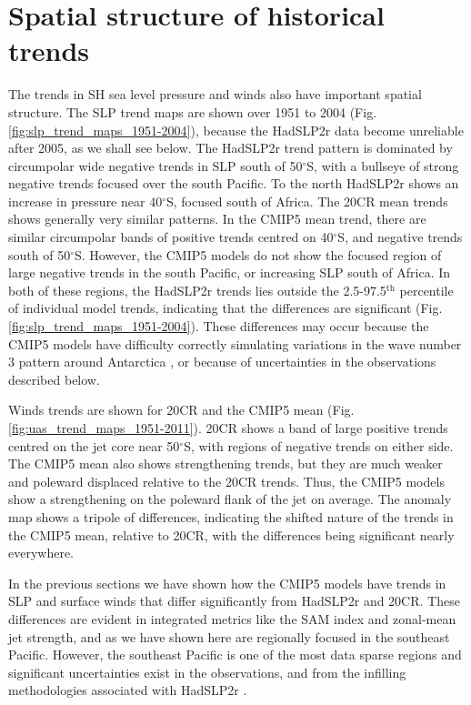 \documentclass{ametsoc}
\begin{document}
\section{Spatial structure of historical trends} \label{sec:spatial_patterns}
The trends in SH sea level pressure and winds also have important spatial structure. The SLP
trend maps are shown over 1951 to 2004 (Fig. \ref{fig:slp_trend_maps_1951-2004}), 
because the HadSLP2r data become unreliable after 2005, as we shall see below. The HadSLP2r trend
pattern is dominated by circumpolar wide negative trends in SLP south of 50$^{\circ}$S, with 
a bullseye of strong negative trends focused over the south Pacific. To the north
HadSLP2r shows an increase in pressure near 40$^{\circ}$S, focused south of Africa. The 20CR mean trends 
shows generally very similar patterns. In the CMIP5 mean trend, there are similar circumpolar bands 
of positive trends centred
on 40$^{\circ}$S, and negative trends south of 50$^{\circ}$S. However, the CMIP5 models do not show the
focused region of large negative trends in the south Pacific, or increasing SLP south of Africa. 
In both  of these regions, the HadSLP2r trends lies outside the 2.5-97.5$^\textrm{th}$ percentile of
individual model trends, indicating  that the differences are significant 
(Fig. \ref{fig:slp_trend_maps_1951-2004}). These differences may occur because the CMIP5 models
have difficulty correctly simulating variations in the wave number 3 pattern around Antarctica 
\citep{Marshall_Bracegirdle_2014}, or because of uncertainties in the observations described below.

Winds trends are shown for 20CR and the CMIP5 mean (Fig. \ref{fig:uas_trend_maps_1951-2011}).  
20CR shows a band of large positive trends centred on the jet core near 50$^{\circ}$S, with
regions of negative trends on either side. The CMIP5 mean also shows strengthening trends,
but they are much weaker and poleward displaced relative to the 20CR trends. Thus,
the CMIP5 models show a strengthening on the poleward flank of the jet on average.  The anomaly map
shows a tripole of differences, indicating the shifted nature of the trends in the CMIP5 mean,
relative to 20CR, with the differences being significant nearly everywhere. 

In the previous sections we have shown how the CMIP5 models have trends in SLP and surface winds
that differ significantly from HadSLP2r and 20CR. These differences are evident in integrated metrics 
like the SAM index and zonal-mean jet strength, and as we have shown here are regionally focused in
the southeast Pacific. However, the southeast Pacific is one of the most data sparse regions
and significant uncertainties exist in the observations, and from the infilling methodologies 
associated with HadSLP2r \citep{Allan_and_Ansell_2006}. 
\end{document}
